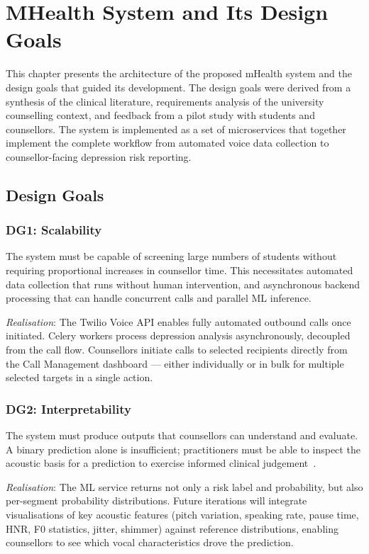 \chapter{MHealth System and Its Design Goals}
\label{Chapter4}

This chapter presents the architecture of the proposed mHealth system and the design goals that guided its development. The design goals were derived from a synthesis of the clinical literature, requirements analysis of the university counselling context, and feedback from a pilot study with students and counsellors. The system is implemented as a set of microservices that together implement the complete workflow from automated voice data collection to counsellor-facing depression risk reporting.

\section{Design Goals}

\subsection{DG1: Scalability}

The system must be capable of screening large numbers of students without requiring proportional increases in counsellor time. This necessitates automated data collection that runs without human intervention, and asynchronous backend processing that can handle concurrent calls and parallel ML inference.

\textit{Realisation}: The Twilio Voice API enables fully automated outbound calls once initiated. Celery workers process depression analysis asynchronously, decoupled from the call flow. Counsellors initiate calls to selected recipients directly from the Call Management dashboard — either individually or in bulk for multiple selected targets in a single action.

\subsection{DG2: Interpretability}

The system must produce outputs that counsellors can understand and evaluate. A binary prediction alone is insufficient; practitioners must be able to inspect the acoustic basis for a prediction to exercise informed clinical judgement~\cite{Thieme2020, Feng2024}.

\textit{Realisation}: The ML service returns not only a risk label and probability, but also per-segment probability distributions. Future iterations will integrate visualisations of key acoustic features (pitch variation, speaking rate, pause time, HNR, F0 statistics, jitter, shimmer) against reference distributions, enabling counsellors to see which vocal characteristics drove the prediction.

